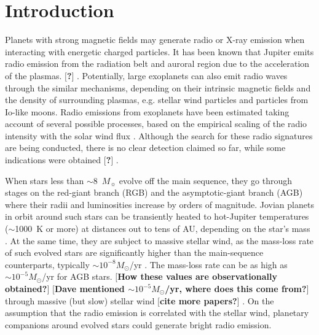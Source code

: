 \documentclass{emulateapj}
\def\memoYF#1{\color{red}$[${\bf #1}$]$ \color{black}}
\begin{document}

\section{Introduction}
\label{sec:intro}



Planets with strong magnetic fields may generate radio or X-ray emission when interacting with energetic charged particles. 
It has been known that Jupiter emits radio emission from the radiation belt and auroral region due to the acceleration of the plasmas. \memoYF{?}. Potentially, large exoplanets can also emit radio waves through the similar mechanisms, depending on their intrinsic magnetic fields and the density of surrounding plasmas, e.g. stellar wind particles and particles from Io-like moons. 
Radio emissions from exoplanets have been estimated taking account of several possible processes, based on the empirical scaling of the radio intensity with the solar wind flux \citep{zarka2001,griebmeier2007,noyola2014}. 
Although the search for these radio signatures are being conducted, there is no clear detection claimed so far, while some indications were obtained \memoYF{?} \citep{lecavelier_et_al2013}. 


When stars less than $\sim$8~$M_\sun$ evolve off the main sequence,
they go through stages on the red-giant branch (RGB) and the
asymptotic-giant branch (AGB) where their radii and luminosities increase by orders of magnitude. 
Jovian planets in orbit around such stars can be transiently heated to hot-Jupiter temperatures ($\sim$1000~K or more) at distances out to tens of AU, depending on the star's mass \citep{spiegel+madhusudhan2012}. 
At the same time, they are subject to massive stellar wind, as the mass-loss rate of such evolved stars are significantly higher than the main-sequence counterparts, typically $\sim  10^{-8} M_{\odot }$/yr \citep{judge1991}. The mass-loss rate can be as high as $\sim  10^{-5} M_{\odot }$/yr for AGB stars. \memoYF{How these values are observationally obtained?} \memoYF{Dave mentioned $\sim  10^{-5} M_{\odot }$/yr, where does this come from?} through massive (but slow) stellar wind \citep{suzuki2008} \memoYF{cite more papers?}. 
On the assumption that the radio emission is correlated with the stellar wind, planetary companions around evolved stars could generate bright radio emission. 
\end{document}
